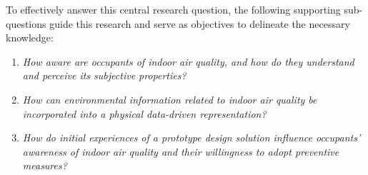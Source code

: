 To effectively answer this central research question, the following supporting sub-questions guide this research and serve as objectives to delineate the necessary knowledge: \\

\begin{enumerate}
    \renewcommand{\labelenumi}{SQ\arabic{enumi}:}
    \item \emph{How aware are occupants of indoor air quality, and how do they understand and perceive its subjective properties?}\label{subq:1}
    \item \emph{How can environmental information related to indoor air quality be incorporated into a physical data-driven representation?}\label{subq:2}
    \item \emph{How do initial experiences of a prototype design solution influence occupants’ awareness of indoor air quality and their willingness to adopt preventive measures?}\label{subq:3}\\
\end{enumerate}